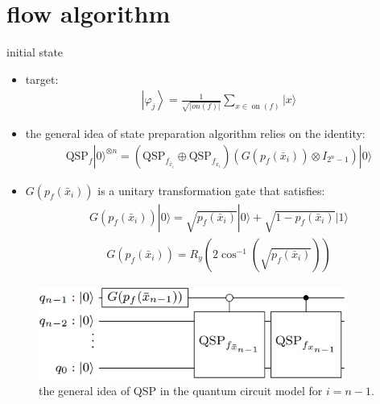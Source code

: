 \section{flow algorithm}
\begin{frame}{initial state }
    \begin{itemize}
      \item target:
      \begin{align}
        \left|\varphi_{j}\right\rangle= \frac{1}{\sqrt{|on(f)|}} \sum_{x \in \operatorname{on}(f)}|x\rangle
      \end{align}
      \item the  general  idea  of  state  preparation  algorithm  relies on the identity:
      \begin{align}
        \mathrm{QSP}_{f}|0\rangle^{\otimes n} = \left(\mathrm{QSP}_{f_{\bar{x}_{i}}} \oplus \mathrm{QSP}_{f_{x_{i}}}\right)\left(G\left(p_{f}\left(\bar{x}_{i}\right)\right) \otimes I_{2^{n}-1}\right)|0\rangle
      \end{align}
      \item $G\left(p_{f}\left(\bar{x}_{i}\right)\right)$ is a unitary transformation gate that satisfies:
      \begin{align}
        G(p_{f}\left(\bar{x}_{i}\right))|0\rangle = \sqrt{p_{f}\left(\bar{x}_{i}\right)}|0\rangle+\sqrt{1-p_{f}\left(\bar{x}_{i}\right)}|1\rangle
      \end{align}
      \begin{align}
        G\left(p_{f}\left(\bar{x}_{i}\right)\right) = R_{y}\left(2 \cos ^{-1}\left(\sqrt{p_{f}\left(\bar{x}_{i}\right)}\right)\right)
      \end{align}
    \end{itemize}
  \end{frame}
  \begin{frame}
    \begin{figure}[htbq]
      \centering
      \includegraphics[width=0.9\textwidth]{figure/QSP.png}
      \caption{the general idea of QSP in the quantum  circuit  model for $i=n-1$.} 
      \label{fig-qsp}
    \end{figure}
  \end{frame}
